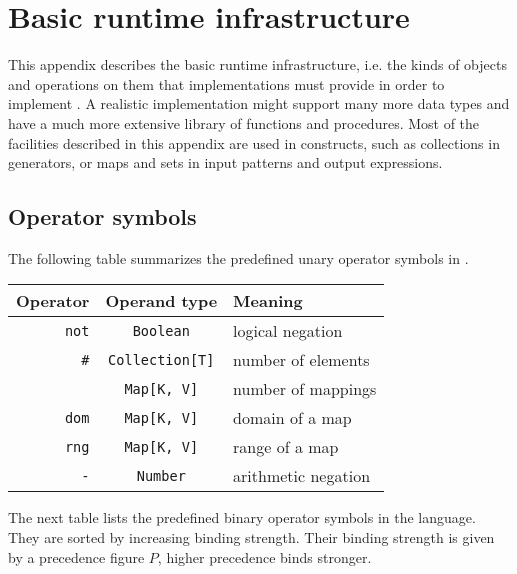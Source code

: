 
\chapter{Basic runtime infrastructure}\label{app:Runtime}

This appendix describes the basic runtime infrastructure, i.e. the
kinds of objects and operations on them that implementations must
provide in order to implement \Cal. A realistic
implementation might support many more data types and have a much more
extensive library of functions and procedures. Most of the facilities described in
this appendix are used in \Cal constructs, such as collections in
generators, or maps and sets in input patterns and output expressions. 

\section{Operator symbols}\label{app:PredefOps}


The following table summarizes the predefined unary operator symbols
in \Cal.


\begin{center}
\begin{tabular}[h]{|r|c|l|}
{\bf Operator}   &  {\bf Operand type} & {\bf Meaning}  \\
\hline\hline
{\tt not}   & {\tt Boolean} & logical negation \\\hline
{\tt \#}    & {\tt Collection[T]} & number of elements \\ \cline{2-3}
            & {\tt Map[K, V]} & number of mappings \\\hline
{\tt dom}   & {\tt Map[K, V]} & domain of a map \\\hline
{\tt rng}   & {\tt Map[K, V]} & range of a map \\\hline
{\tt -}     & {\tt Number} & arithmetic negation \\ \hline
\end{tabular}
\end{center}\vspace{3mm}


The next table lists the predefined binary operator symbols in the
\Cal language. They are sorted by increasing binding strength. Their
binding strength is given by a precedence figure $P$, higher precedence
binds stronger.

